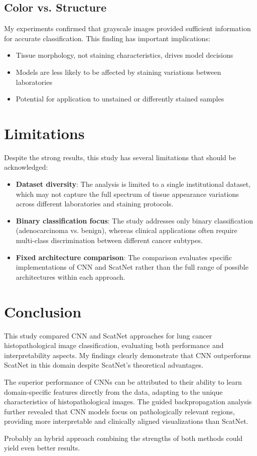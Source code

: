 \documentclass[10pt,twocolumn]{article}
\begin{document}
\subsection{Color vs. Structure}
My experiments confirmed that grayscale images provided sufficient information for accurate classification. This finding has important implications:
\begin{itemize}
    \item Tissue morphology, not staining characteristics, drives model decisions
    \item Models are less likely to be affected by staining variations between laboratories
    \item Potential for application to unstained or differently stained samples
\end{itemize}

\section{Limitations}
Despite the strong results, this study has several limitations that should be acknowledged:

\begin{itemize}
    \item \textbf{Dataset diversity}: The analysis is limited to a single institutional dataset, which may not capture the full spectrum of tissue appearance variations across different laboratories and staining protocols.
    
    \item \textbf{Binary classification focus}: The study addresses only binary classification (adenocarcinoma vs. benign), whereas clinical applications often require multi-class discrimination between different cancer subtypes.
    
    \item \textbf{Fixed architecture comparison}: The comparison evaluates specific implementations of CNN and ScatNet rather than the full range of possible architectures within each approach.
\end{itemize}

\section{Conclusion}
This study compared CNN and ScatNet approaches for lung cancer histopathological image classification, evaluating both performance and interpretability aspects. My findings clearly demonstrate that CNN outperforms ScatNet in this domain despite ScatNet's theoretical advantages.

The superior performance of CNNs can be attributed to their ability to learn domain-specific features directly from the data, adapting to the unique characteristics of histopathological images. The guided backpropagation analysis further revealed that CNN models focus on pathologically relevant regions, providing more interpretable and clinically aligned visualizations than ScatNet.

Probably an hybrid approach combining the strengths of both methods could yield even better results.
\end{document}
